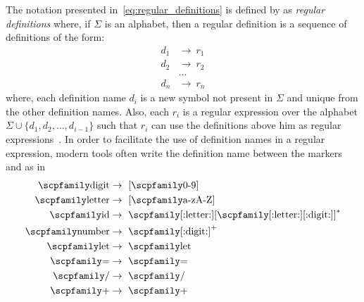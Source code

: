 \documentclass[
  oneside,
  english,
  coorientadorbanca,
  noabntexcite
]{ufsc-thesis-rn46-2019}
\newcommand{\code}[1]{\text{\scpfamily\setlength\spaceskip{0.35em}#1}}
\begin{document}
The notation presented in~\eqref{eq:regular_definitions} is defined by \textcite{Aho:2006:CPT:1177220} as \textit{regular definitions} where, if $\Sigma$ is an alphabet, then a regular definition is a sequence of definitions of the form:
\begin{equation*}
  \begin{aligned}
    d_1 & \rightarrow \ r_1 \\
    d_2 & \rightarrow \ r_2 \\
        & \dots             \\
    d_n & \rightarrow \ r_n
  \end{aligned}
\end{equation*}
where, each definition name $d_i$ is a new symbol not present in $\Sigma$ and unique from the other definition names.
Also, each $r_i$ is a regular expression over the alphabet $\Sigma \cup \{ d_1, d_2, \dots, d_{i-1}\}$ such that $r_i$ can use the definitions above him as regular expressions~\cite{Aho:2006:CPT:1177220}.
In order to facilitate the use of definition names in a regular expression, modern tools often write the definition name between the markers \code{[:} and \code{:]} as in
\begin{equation}\label{eq:regular_definitions_with_variables}
  \begin{aligned}
    \code{digit}  & \rightarrow \ [\code{0-9}]                                      \\
    \code{letter} & \rightarrow \ [\code{a-zA-Z}]                                   \\
    \code{id}     & \rightarrow \ \code{[:letter:]}{[\code{[:letter:][:digit:]}]}^* \\
    \code{number} & \rightarrow \ \code{[:digit:]}^+                                \\
    \code{let}    & \rightarrow \ \code{let}                                        \\
    \code{=}      & \rightarrow \ \code{=}                                          \\
    \code{/}      & \rightarrow \ \code{/}                                          \\
    \code{+}      & \rightarrow \ \code{+}                                          \\
  \end{aligned}
\end{equation}
\end{document}
